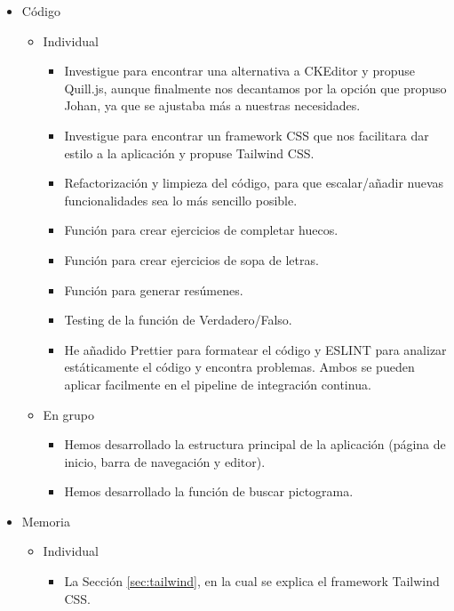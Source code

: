 \begin{itemize}
    \item Código
          \begin{itemize}
              \item Individual
                    \begin{itemize}
                        \item Investigue para encontrar una alternativa a CKEditor y propuse Quill.js, aunque finalmente nos decantamos por la opción que propuso Johan, ya que se ajustaba más a nuestras necesidades.
                        \item Investigue para encontrar un framework CSS que nos facilitara dar estilo a la aplicación y propuse Tailwind CSS.
                        \item Refactorización y limpieza del código, para que escalar/añadir nuevas funcionalidades sea lo más sencillo posible.
                        \item Función para crear ejercicios de completar huecos.
                        \item Función para crear ejercicios de sopa de letras.
                        \item Función para generar resúmenes.
                        \item Testing de la función de Verdadero/Falso.
                        \item He añadido Prettier para formatear el código y ESLINT para analizar estáticamente el código y encontra problemas. Ambos se pueden aplicar facilmente en el pipeline de integración continua.
                    \end{itemize}
              \item En grupo
                    \begin{itemize}
                        \item Hemos desarrollado la estructura principal de la aplicación (página de inicio, barra de navegación y editor).
                        \item Hemos desarrollado la función de buscar pictograma.
                    \end{itemize}
          \end{itemize}
    \item Memoria
          \begin{itemize}
              \item Individual
                    \begin{itemize}
                        \item La Sección \ref{sec:tailwind}, en la cual se explica el framework Tailwind CSS.

\end{itemize}
\end{itemize}
\end{itemize}
